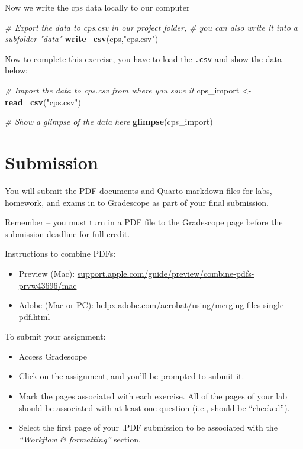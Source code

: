 \documentclass[
]{article}
\newenvironment{Shaded}{\begin{snugshade}}{\end{snugshade}}
\newcommand{\CommentTok}[1]{\textcolor[rgb]{0.56,0.35,0.01}{\textit{#1}}}
\newcommand{\FunctionTok}[1]{\textcolor[rgb]{0.13,0.29,0.53}{\textbf{#1}}}
\newcommand{\NormalTok}[1]{#1}
\newcommand{\OtherTok}[1]{\textcolor[rgb]{0.56,0.35,0.01}{#1}}
\newcommand{\StringTok}[1]{\textcolor[rgb]{0.31,0.60,0.02}{#1}}
\begin{document}
Now we write the cps data locally to our computer

\begin{Shaded}
\begin{Highlighting}[]
\CommentTok{\# Export the data to cps.csv in our project folder, }
\CommentTok{\# you can also write it into a subfolder "data"}
\FunctionTok{write\_csv}\NormalTok{(cps,}\StringTok{"cps.csv"}\NormalTok{)}
\end{Highlighting}
\end{Shaded}

Now to complete this exercise, you have to load the \texttt{.csv} and
show the data below:

\begin{Shaded}
\begin{Highlighting}[]
\CommentTok{\# Import the data to cps.csv from where you save it}
\NormalTok{cps\_import }\OtherTok{\textless{}{-}} \FunctionTok{read\_csv}\NormalTok{(}\StringTok{"cps.csv"}\NormalTok{)}

\CommentTok{\# Show a glimpse of the data here}
\FunctionTok{glimpse}\NormalTok{(cps\_import)}
\end{Highlighting}
\end{Shaded}

\section{Submission}\label{submission}

You will submit the PDF documents and Quarto markdown files for labs,
homework, and exams in to Gradescope as part of your final submission.

Remember -- you must turn in a PDF file to the Gradescope page before
the submission deadline for full credit.

Instructions to combine PDFs:

\begin{itemize}
\item
  Preview (Mac):
  \href{https://support.apple.com/guide/preview/combine-pdfs-prvw43696/mac}{support.apple.com/guide/preview/combine-pdfs-prvw43696/mac}
\item
  Adobe (Mac or PC):
  \href{https://helpx.adobe.com/acrobat/using/merging-files-single-pdf.html}{helpx.adobe.com/acrobat/using/merging-files-single-pdf.html}
\end{itemize}

To submit your assignment:

\begin{itemize}
\item
  Access Gradescope
\item
  Click on the assignment, and you'll be prompted to submit it.
\item
  Mark the pages associated with each exercise. All of the pages of your
  lab should be associated with at least one question (i.e., should be
  ``checked'').
\item
  Select the first page of your .PDF submission to be associated with
  the \emph{``Workflow \& formatting''} section.
\end{itemize}
\end{document}

